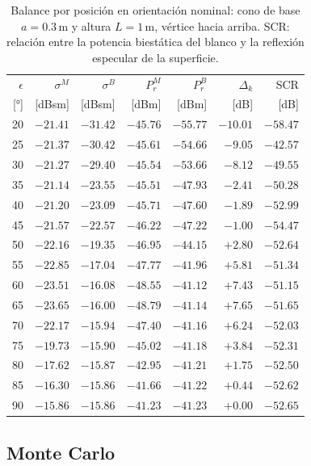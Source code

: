 \documentclass[11pt,a4paper]{report}
\begin{document}
\begin{table}[H]
\centering
\caption{Balance por posición en orientación nominal: cono de base $a=0.3$\,m y altura $L=1$\,m, vértice hacia arriba. SCR: relación entre la potencia biestática del blanco y la reflexión especular de la superficie.}
\label{tab:cono_nominal}
\small
\begin{tabular}{@{}rrrrrrr@{}}
\toprule
$\epsilon$ & $\sigma^M$ & $\sigma^B$ & $P_r^M$ & $P_r^B$ & $\Delta_k$ & SCR \\
{[°]} & [dBsm] & [dBsm] & [dBm] & [dBm] & [dB] & [dB] \\
\midrule
20 & $-21.41$ & $-31.42$ & $-45.76$ & $-55.77$ & $-10.01$ & $-58.47$ \\
25 & $-21.37$ & $-30.42$ & $-45.61$ & $-54.66$ & $-9.05$ & $-42.57$ \\
30 & $-21.27$ & $-29.40$ & $-45.54$ & $-53.66$ & $-8.12$ & $-49.55$ \\
35 & $-21.14$ & $-23.55$ & $-45.51$ & $-47.93$ & $-2.41$ & $-50.28$ \\
40 & $-21.20$ & $-23.09$ & $-45.71$ & $-47.60$ & $-1.89$ & $-52.99$ \\
45 & $-21.57$ & $-22.57$ & $-46.22$ & $-47.22$ & $-1.00$ & $-54.47$ \\
50 & $-22.16$ & $-19.35$ & $-46.95$ & $-44.15$ & $+2.80$ & $-52.64$ \\
55 & $-22.85$ & $-17.04$ & $-47.77$ & $-41.96$ & $+5.81$ & $-51.34$ \\
60 & $-23.51$ & $-16.08$ & $-48.55$ & $-41.12$ & $+7.43$ & $-51.15$ \\
65 & $-23.65$ & $-16.00$ & $-48.79$ & $-41.14$ & $+7.65$ & $-51.65$ \\
70 & $-22.17$ & $-15.94$ & $-47.40$ & $-41.16$ & $+6.24$ & $-52.03$ \\
75 & $-19.73$ & $-15.90$ & $-45.02$ & $-41.18$ & $+3.84$ & $-52.31$ \\
80 & $-17.62$ & $-15.87$ & $-42.95$ & $-41.21$ & $+1.75$ & $-52.50$ \\
85 & $-16.30$ & $-15.86$ & $-41.66$ & $-41.22$ & $+0.44$ & $-52.62$ \\
90 & $-15.86$ & $-15.86$ & $-41.23$ & $-41.23$ & $+0.00$ & $-52.65$ \\
\bottomrule
\end{tabular}
\end{table}

\subsection{Monte Carlo}
\end{document}
